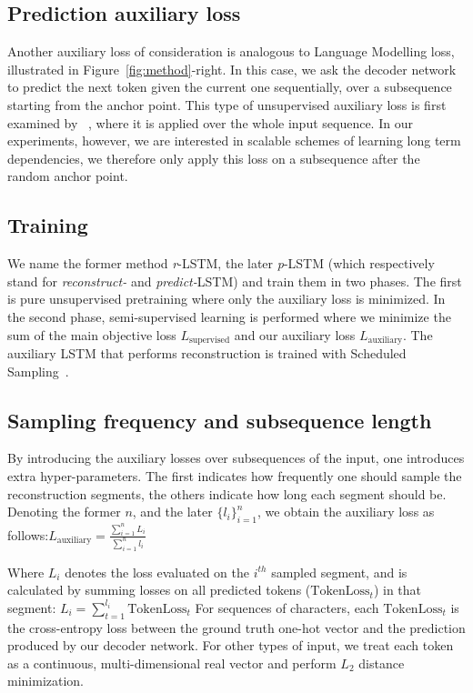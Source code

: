 \documentclass{article}
\newcommand{\rlstm}{{\it r}-LSTM}
\newcommand{\plstm}{{\it p}-LSTM}
\begin{document}
\subsection{Prediction auxiliary loss}

Another auxiliary loss of consideration is analogous to Language Modelling loss, illustrated in Figure~\ref{fig:method}-right. In this case, we ask the decoder network to predict the next token given the current one sequentially, over a subsequence starting from the anchor point. This type of unsupervised auxiliary loss is first examined by ~\citet{dai2015semi}, where it is applied over the whole input sequence. In our experiments, however, we are interested in scalable schemes of learning long term dependencies, we therefore only apply this loss on a subsequence after the random anchor point.

\subsection{Training}

We name the former method \rlstm{}, the later \plstm{} (which respectively stand for {\it reconstruct-} and {\it predict-}LSTM) and train them in two phases. The first is pure unsupervised pretraining where only the auxiliary loss is minimized. In the second phase, semi-supervised learning is performed where we minimize the sum of the main objective loss $L_{\textrm{supervised}}$ and our auxiliary loss $L_{\textrm{auxiliary}}$. The auxiliary LSTM that performs reconstruction is trained with Scheduled Sampling~\cite{bengio2015scheduled}.

\subsection{Sampling frequency and subsequence length}

By introducing the auxiliary losses over subsequences of the input, one introduces extra hyper-parameters. The first indicates how frequently one should sample the reconstruction segments, the others indicate how long each segment should be. Denoting the former \(n\), and the later \(\{l_i\}_{i=1}^n\), we obtain the auxiliary loss as follows:$
    L_{\textrm{auxiliary}} = \frac{\sum_{i=1}^nL_i}{\sum_{i=1}^nl_i}$

Where $L_i$ denotes the loss evaluated on the $i^{th}$ sampled segment, and is calculated by summing losses on all predicted tokens ($\textrm{TokenLoss}_t$) in that segment:
    $L_{i} = \sum_{t=1}^{l_i}\textrm{TokenLoss}_t$
For sequences of characters, each $\textrm{TokenLoss}_t$ is the cross-entropy loss between the ground truth one-hot vector and the prediction produced by our decoder network. For other types of input, we treat each token as a continuous, multi-dimensional real vector and perform $L_2$ distance minimization.
\end{document}
